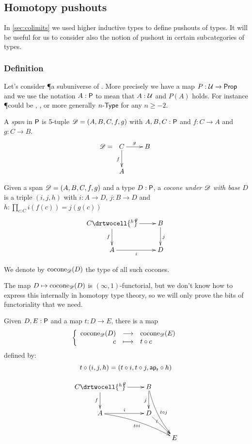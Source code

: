\subsection{Homotopy pushouts}
\label{sec:pushouts}

In \autoref{sec:colimits} we used higher inductive types to define pushouts of types.
It will be useful for us to consider also the notion of pushout in certain subcategories of types.

\subsubsection{Definition}
\label{sec:push:definition}

Let's consider \P a subuniverse of \type. More precisely we have a map
$P:\type\to\prop$ and we use the notation $A:\P$ to mean that $A:\type$ and
$P(A)$ holds. For instance \P could be \prop, \set, or more generally
$\typele{n}$ for any $n\ge-2$.

\begin{defn}
  A \emph{span} in $\P$ is 5-tuple $\Ddiag=(A,B,C,f,g)$ with
  $A,B,C:\P$ and $f:C\to{}A$ and $g:C\to{}B$.
  \[\Ddiag=\xymatrix{C \ar^g[r] \ar_f[d] & B \\ A & }\]
\end{defn}

\begin{defn}
  Given a span $\Ddiag=(A,B,C,f,g)$ and a type $D:\P$, a
  \emph{cocone under $\Ddiag$ with base $D$} is a triple $(i, j, h)$ with
  $i:A\to{}D$, $j:B\to{}D$ and $h : \prod_{c:C}i(f(c))=j(g(c))$
  \[\uppercurveobject{{ }}\lowercurveobject{{ }}\twocellhead{{ }}
  \xymatrix{C \ar^g[r] \ar_f[d] \drtwocell{^h} & B \ar^j[d] \\ A \ar_i[r] & D
  }\]

  We denote by $\cocone{\Ddiag}{D}$ the type of all such cocones.
\end{defn}

The map $D\mapsto\cocone{\Ddiag}{D}$ is $(\infty,1)$-functorial, but we don't
know how to express this internally in homotopy type theory, so we will only
prove the bits of functoriality that we need.

\begin{defn}
  Given $D,E:\P$ and a map $t:D\to{}E$, there is a map
  \[\function{\cocone{\Ddiag}{D}}{\cocone{\Ddiag}{E}}{c}{\composecocone{t}c}\]
  defined by:
  \[\composecocone{t}(i,j,h)=(t\circ{}i,t\circ{}j,\mapfunc{t}\circ{}h)\]

  \[\uppercurveobject{{ }}\lowercurveobject{{ }}\twocellhead{{ }}
  \xymatrix{C \ar^g[r] \ar_f[d] \drtwocell{^h} & B \ar_j[d]
    \ar@/_/^{t\circ{}j}[rdd] & \\
    A \ar^i[r] \ar@/^/_{t\circ{}i}[rrd] & D \ar[rd]|<<<<t & \\
    & & E }\]
\end{defn}

